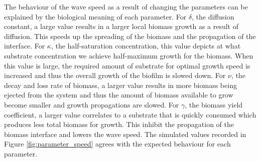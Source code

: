 The behaviour of the wave speed as a result of changing the parameters can be explained by the biological meaning of each parameter.
For $\delta$, the diffusion constant, a large value results in a larger local biomass growth as a result of diffusion.
This speeds up the spreading of the biomass and the propagation of the interface.
For $\kappa$, the half-saturation concentration, this value depicts at what substrate concentration we achieve half-maximum growth for the biomass.
When this value is large, the required amount of substrate for optimal growth speed is increased and thus the overall growth of the biofilm is slowed down.
For $\nu$, the decay and loss rate of biomass, a larger value results in more biomass being ejected from the system and thus the amount of biomass available to grow become smaller and growth propagations are slowed.
For $\gamma$, the biomass yield coefficient, a larger value correlates to a substrate that is quickly consumed which produces less total biomass for growth.
This inhibit the propagation of the biomass interface and lowers the wave speed.
The simulated values recorded in Figure \ref{fig:parameter_speed} agrees with the expected behaviour for each parameter.



